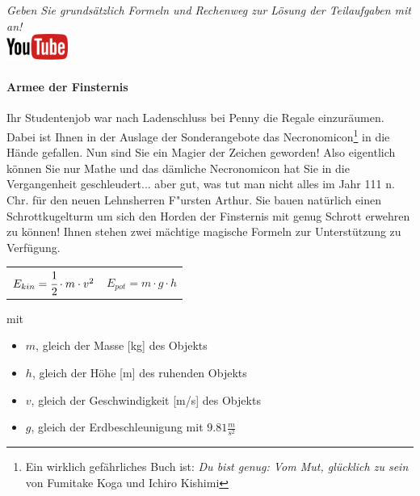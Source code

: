 \documentclass[a4paper, 9pt]{scrartcl}\usepackage[]{graphicx}\usepackage[]{xcolor}
\begin{document}
\textit{Geben Sie grunds{\"a}tzlich Formeln und Rechenweg zur L{\"o}sung der
  Teilaufgaben mit an!} \\[1Ex]

\hfill\href{https://youtu.be/Bbu6n8MXxQk}{\includegraphics[width =
  2cm]{img/youtube}} %
\hspace{2Ex}

\paragraph{Armee der Finsternis}



Ihr Studentenjob war nach Ladenschluss bei Penny die Regale
einzur{\"a}umen. Dabei ist Ihnen in der Auslage der Sonderangebote das
Necronomicon\footnote{Ein wirklich gef{\"a}hrliches Buch ist:
  \textit{Du bist genug: Vom Mut, gl{\"u}cklich zu sein} von Fumitake Koga und
  Ichiro Kishimi} in die H{\"a}nde gefallen. Nun sind Sie ein Magier der
Zeichen geworden! Also eigentlich k{\"o}nnen Sie nur Mathe und das d{\"a}mliche
Necronomicon hat Sie in die Vergangenheit geschleudert... aber gut, was tut
man nicht alles im Jahr 111 n. Chr. f{\"u}r den neuen Lehnsherren
F{"u}rsten Arthur. Sie bauen nat{\"u}rlich einen Schrottkugelturm um sich den
Horden der Finsternis mit genug Schrott erwehren zu k{\"o}nnen! Ihnen stehen
zwei m{\"a}chtige magische Formeln zur Unterst{\"u}tzung zu Verf{\"u}gung.

\begin{center}
  \begin{tabular}{cc}
    $E_{kin} = \cfrac{1}{2}\cdot m \cdot v^2$ & $E_{pot} = m \cdot g \cdot h$\\
  \end{tabular}
\end{center}

mit

\begin{itemize}
\item $m$, gleich der Masse [kg] des Objekts
\item $h$, gleich der H{\"o}he [m] des ruhenden Objekts
\item $v$, gleich der Geschwindigkeit [m/s] des Objekts
\item $g$, gleich der Erdbeschleunigung mit $9.81 \tfrac{m}{s^2}$ 
\end{itemize}
\end{document}
